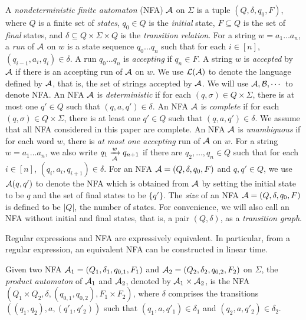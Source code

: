 A \emph{nondeterministic finite automaton} (NFA) $\mathcal{A}$ on $\Sigma$ is a tuple $(Q, \delta, q_0, F)$, where $Q$ is a finite set of \emph{states}, $q_0 \in Q$ is the \emph{initial} state, $F \subseteq Q$ is the set of \emph{final} states, and $\delta \subseteq Q \times \Sigma \times Q$ is the \emph{transition relation}. For a string $w = a_1 \dots a_n$, a \emph{run} of $\mathcal{A}$ on $w$ is a state sequence $q_0 \dots q_n$ such that for each $i \in [n]$, $(q_{i-1}, a_i, q_i) \in \delta$. A run $q_0 \dots q_n$ is \emph{accepting} if $q_n \in F$. A string $w$ is \emph{accepted} by $\mathcal{A}$ if there is an accepting run of $\mathcal{A}$ on $w$. We use $\mathcal{L}(\mathcal{A})$ to denote the language defined by $\mathcal{A}$, that is, the set of strings accepted by $\mathcal{A}$. We will use $\mathcal{A}, \mathcal{B}, \cdots$ to denote NFA. An NFA $\mathcal{A}$ is \emph{deterministic} if for each $(q, \sigma) \in Q \times \Sigma$, there is at most one $q' \in Q$ such that $(q, a, q') \in \delta$. An NFA $\mathcal{A}$ is \emph{complete} if for each $(q, \sigma) \in Q \times \Sigma$, there is at least one $q' \in Q$ such that $(q, a, q') \in \delta$. We assume that all NFA considered in this paper are complete.  An NFA $\mathcal{A}$ is \emph{unambiguous} if for each word $w$, there is \emph{at most one accepting} run of $\mathcal{A}$ on $w$.
For a string $w= a_1 \dots a_n$, we also write $q_1 \xrightarrow[\mathcal{A}]{w} q_{n+1}$ if there are $q_2,\dots, q_n \in Q$ such that for each $i \in [n]$, $(q_i, a_i, q_{i+1}) \in \delta$.  For an NFA $\mathcal{A}=(Q, \delta, q_0, F)$ and $q, q' \in Q$, we use $\mathcal{A}(q,q')$ to denote the NFA which is obtained from $\mathcal{A}$ by setting the initial state to be $q$ and the set of final states to be $\{q'\}$. The \emph{size} of an NFA $\mathcal{A}=(Q, \delta, q_0, F)$ is defined to be $|Q|$, the number of states. For convenience, we will also call an NFA without initial and final states, that is, a pair $(Q, \delta)$, as a \emph{transition graph}.

\begin{proposition}[\cite{HU79}]
Regular expressions and NFA are expressively equivalent. In particular, from a regular expression, an equivalent NFA can be constructed in linear time.
\end{proposition}

Given two NFA $\mathcal{A}_1=(Q_1, \delta_1, q_{0,1}, F_1)$ and $\mathcal{A}_2=(Q_2, \delta_2, q_{0,2}, F_2)$ on $\Sigma$, the \emph{product automaton} of $\mathcal{A}_1$ and $\mathcal{A}_2$, denoted by $\mathcal{A}_1 \times \mathcal{A}_2$, is the NFA $(Q_1 \times Q_2, \delta, (q_{0,1}, q_{0,2}), F_1 \times F_2)$, where $\delta$ comprises the transitions $((q_1, q_2), a, (q'_1, q'_2))$ such that $(q_1, a, q'_1) \in \delta_1$ and $(q_2, a, q'_2) \in \delta_2$.  

